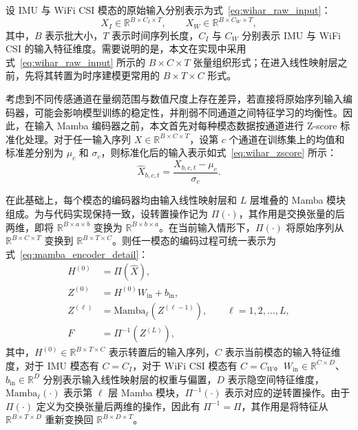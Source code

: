 设 IMU 与 WiFi CSI 模态的原始输入分别表示为式~\eqref{eq:wihar_raw_input}：
\begin{equation}
X_I \in \mathbb{R}^{B \times C_I \times T}, \qquad
X_W \in \mathbb{R}^{B \times C_W \times T},
\label{eq:wihar_raw_input}
\end{equation}
其中，$B$ 表示批大小，$T$ 表示时间序列长度，$C_I$ 与 $C_W$ 分别表示 IMU 与 WiFi CSI 的输入特征维度。需要说明的是，本文在实现中采用式~\eqref{eq:wihar_raw_input} 所示的 $B \times C \times T$ 张量组织形式；在进入线性映射层之前，先将其转置为时序建模更常用的 $B \times T \times C$ 形式。

考虑到不同传感通道在量纲范围与数值尺度上存在差异，若直接将原始序列输入编码器，可能会影响模型训练的稳定性，并削弱不同通道之间特征学习的均衡性。因此，在输入 Mamba 编码器之前，本文首先对每种模态数据按通道进行 Z-score 标准化处理。对于任一输入序列 $X \in \mathbb{R}^{B \times C \times T}$，设第 $c$ 个通道在训练集上的均值和标准差分别为 $\mu_c$ 和 $\sigma_c$，则标准化后的输入表示如式~\eqref{eq:wihar_zscore} 所示：
\begin{equation}
\hat{X}_{b,c,t}=\frac{X_{b,c,t}-\mu_c}{\sigma_c}.
\label{eq:wihar_zscore}
\end{equation}

在此基础上，每个模态的编码器均由输入线性映射层和 $L$ 层堆叠的 Mamba 模块组成。为与代码实现保持一致，设转置操作记为 $\Pi(\cdot)$，其作用是交换张量的后两维，即将 $\mathbb{R}^{B \times a \times b}$ 变换为 $\mathbb{R}^{B \times b \times a}$。在当前输入情形下，$\Pi(\cdot)$ 将原始序列从 $\mathbb{R}^{B \times C \times T}$ 变换到 $\mathbb{R}^{B \times T \times C}$。则任一模态的编码过程可统一表示为式~\eqref{eq:mamba_encoder_detail}：
\begin{equation}
\begin{aligned}
H^{(0)} &= \Pi(\hat{X}), \\
Z^{(0)} &= H^{(0)} W_{\mathrm{in}} + b_{\mathrm{in}}, \\
Z^{(\ell)} &= \mathrm{Mamba}_{\ell}\!\left(Z^{(\ell-1)}\right), \qquad \ell=1,2,\dots,L, \\
F &= \Pi^{-1}\!\left(Z^{(L)}\right),
\end{aligned}
\label{eq:mamba_encoder_detail}
\end{equation}
其中，$H^{(0)} \in \mathbb{R}^{B \times T \times C}$ 表示转置后的输入序列，$C$ 表示当前模态的输入特征维度，对于 IMU 模态有 $C=C_I$，对于 WiFi CSI 模态有 $C=C_W$。$W_{\mathrm{in}} \in \mathbb{R}^{C \times D}$、$b_{\mathrm{in}} \in \mathbb{R}^{D}$ 分别表示输入线性映射层的权重与偏置，$D$ 表示隐空间特征维度，$\mathrm{Mamba}_{\ell}(\cdot)$ 表示第 $\ell$ 层 Mamba 模块，$\Pi^{-1}(\cdot)$ 表示对应的逆转置操作。由于 $\Pi(\cdot)$ 定义为交换张量后两维的操作，因此有 $\Pi^{-1}=\Pi$，其作用是将特征从 $\mathbb{R}^{B \times T \times D}$ 重新变换回 $\mathbb{R}^{B \times D \times T}$。

